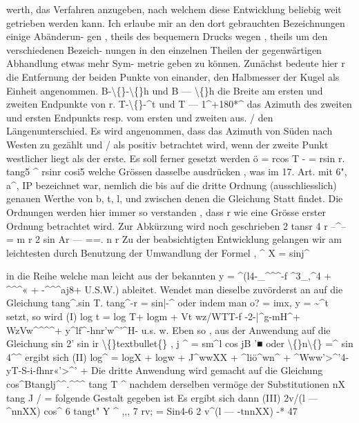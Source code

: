 \documentclass[12pt,a4paper]{article}
\begin{document}
werth,  das  Verfahren  anzugeben,  nach  welchem  diese  Entwicklung  beliebig  weit getrieben  werden  kann. Ich  erlaube  mir  an  den  dort  gebrauchten  Bezeichnungen  einige  Abänderun- gen ,  theils  des  bequemern  Drucks  wegen ,  theils  um  den  verschiedenen  Bezeich- nungen in  den  einzelnen  Theilen  der  gegenwärtigen  Abhandlung  etwas  mehr  Sym- metrie geben  zu  können.     Zunächst  bedeute  hier r  die  Entfernung  der  beiden  Punkte  von  einander,  den  Halbmesser  der  Kugel als  Einheit  angenommen. B-\textbackslash\{\}-\textbackslash\{\}h  und  B --- \textbackslash\{\}h   die  Breite  am  ersten  und  zweiten  Endpunkte  von  r. T-\textbackslash\{\}-\^{}t  und   T --- 1\^{}+180*\^{}   das  Azimuth  des  zweiten  und  ersten  Endpunkts resp.  vom  ersten  und  zweiten  aus. /  den  Längenunterschied. Es  wird  angenommen,  dass  das  Azimuth  von  Süden  nach  Westen  zu  gezählt  und /  als  positiv  betrachtet  wird,  wenn  der  zweite  Punkt  westlicher  liegt  als  der  erste. Es  soll  ferner  gesetzt  werden ö  =  rcos  T -  =  rsin  r.  tang5 \^{}       rsinr cosi5 welche  Grössen  dasselbe  ausdrücken ,  was  im  17.  Art.  mit  6",  a\^{},  IP  bezeichnet war,  nemlich  die  bis  auf  die  dritte  Ordnung  (ausschliesslich)  genauen  Werthe von    b,  t,  l,    und  zwischen  denen  die  Gleichung Statt  findet.  Die  Ordnungen  werden  hier  immer  so  verstanden ,  dass  r  wie  eine Grösse  erster  Ordnung  betrachtet  wird. Zur  Abkürzung  wird  noch  geschrieben 2  tansr  4  r --\^{}--  =  m r 2  sin  Ar ---  ==.  n r Zu  der  beabsichtigten  Entwicklung  gelangen  wir  am  leichtesten  durch  Benutzung der  Umwandlung  der  Formel  , \^{}        X  =  sinj\^{}

in  die  Reihe welche  man  leicht  aus  der  bekannten y  =  \^{}(l4-\_\^{}\^{}\^{}-f  \^{}3\_,\^{}4  +  \^{}\^{}\^{}«  +  -\^{}\^{}\^{}aj8+    U.S.W.) ableitet.     Wendet  man  dieselbe  zuvörderst  an  auf  die  Gleichung tang\^{}.sin  T.  tang\^{}-r  =  sin|-\^{} oder indem  man   o?  =  imx,  y  =  \textasciitilde{}\^{}t   setzt,  so  wird  (I) log  t  =  log  T+  logm  +  Vt  wz/WTT-f  -2-|\^{}g-mH\^{}+  WzVw\^{}\^{}\^{}\^{}+  y\^{}lf\^{}-hnr'w\^{}'\^{}H-  u.s.  w. Eben  so ,  aus  der  Anwendung  auf  die  Gleichung sin  2' sin  ir  \textbackslash\{\}textbullet\{\}     ,  j \^{}  =  sm\^{}l cos  jB  '■ oder \textbackslash\{\}n\textbackslash\{\}  =\^{}  sin 4\^{}\^{} ergibt  sich  (II) log\^{}  =  logX  +  logw  +  J\^{}wwXX  +  \^{}liö\^{}wn\^{}  +  \^{}Www'>\^{}'4-yT-S-i-fhnr«'>\^{}'  + Die  dritte  Anwendung  wird  gemacht  auf  die  Gleichung cos\^{}Btanglj\^{}\^{}.\^{}\^{}\^{} tang  T \^{} nachdem  derselben  vermöge  der  Substitutionen nX tang  J  /  = folgende  Gestalt  gegeben  ist Es  ergibt  sich  dann  (III) 2v/(l  --- \^{}nnXX) cos\^{}        6 tangt"  Y \^{}    ,,,       7   rv;    =   Sin4-6 2  v\^{}(l  --- -tnnXX)  -* 47
\end{document}
